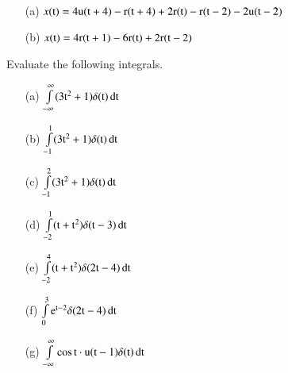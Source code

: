 \begin{solution}
~

\begin{itemize}
\item[{\rm (a)}] $x(\textrm{t}) = 4 \textrm{u}(\textrm{t}+4)- \textrm{r}(\textrm{t} + 4) + 2\textrm{r}(\textrm{t}) - \textrm{r}(\textrm{t}-2)-2\textrm{u}(\textrm{t}-2)$

\item[{\rm (b)}] $x(\textrm{t}) = 4\textrm{r}(\textrm{t}+1)-6\textrm{r}(\textrm{t})+ 2\textrm{r}(\textrm{t}-2)$
\end{itemize}
\end{solution}

\begin{exam*}
Evaluate the following integrals.

\medskip
\begin{itemize}
\item[{\rm(a)}] $\int\limits_{-\infty}^{\infty}(3\textrm{t}^{2}+1)\delta(\textrm{t})\operatorname{dt}$

\item[{\rm(b)}] $\int\limits_{-1}^{1}(3\textrm{t}^{2} + 1)\delta(\textrm{t}) \operatorname{dt}$

\item[{\rm(c)}]  $\int\limits_{-1}^{2} (3\textrm{t}^{2}+1)\delta(\textrm{t})\operatorname{dt}$

\item[{\rm(d)}] $\int\limits_{-2}^{1} (\textrm{t} + \textrm{t}^{2})\delta(\textrm{t}-3)\operatorname{dt}$

\item[{\rm(e)}] $\int\limits_{-2}^{4} (\textrm{t} + \textrm{t}^{2})\delta(2\textrm{t}-4)\operatorname{dt}$

\item[{\rm(f)}] $\int\limits_{0}^{3} \textrm{e}^{\textrm{t}-2} \delta(2\textrm{t}-4) \operatorname{dt}$

\item[{\rm(g)}] $\int\limits_{-\infty}^{\infty} \cos \textrm{t}\cdot \textrm{u}(\textrm{t}-1)\delta(\textrm{t})\operatorname{dt}$
\end{itemize}
\end{exam*}

